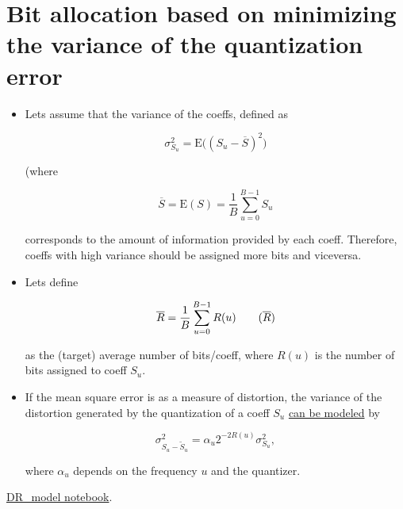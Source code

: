 \section{Bit allocation based on minimizing the variance of the quantization error}
\begin{itemize}
\item
  Lets assume that the variance of the coeffs, defined as

  \begin{equation}
    \sigma_{S_u}^2 = \text{E}\big( (S_u - \overline{S})^2\big)
   \end{equation}

  (where

  \begin{equation}
     \overline{S} = \text{E}(S) = \frac{1}{B}\sum_{u=0}^{B-1} S_u
   \end{equation}

  corresponds to the amount of information provided by each coeff.
  Therefore, coeffs with high variance should be assigned more bits and
  viceversa.
\item
  Lets define

  \begin{equation}
    {\overline{R}} = \frac{1}{B}\sum_{u=0}^{B-1}R(u)
    \tag{$\overline{R}$}
  \end{equation}

  as the (target) average number of bits/coeff, where \(R(u)\) is the
  number of bits assigned to coeff \(S_u\).
\item
  If the mean square error is as a measure of distortion, the variance
  of the distortion generated by the quantization of a coeff \(S_u\)
  \href{http://cdn.intechopen.com/pdfs/16267/InTech-Rate_control_in_video_coding.pdf}{can
  be modeled} by

  \begin{equation}
    \sigma_{S_u-\tilde{S}_u}^2=\alpha_{u}2^{-2R(u)}\sigma_{S_u}^2,
  \end{equation}

  where \(\alpha_{u}\) depends on the frequency \(u\) and the quantizer.
\end{itemize}

\href{https://nbviewer.jupyter.org/github/vicente-gonzalez-ruiz/image_transformations_for_coding/blob/master/DR_model.ipynb}{DR\_model notebook}.
    
